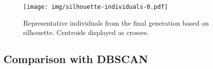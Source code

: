 \begin{figure}[htbp]
    \centering
    \texttt{[image: img/silhouette-individuals-0.pdf]}
    \caption{Representative individuals from the final generation based on
             silhouette. Centroids displayed as
             crosses.}\label{figure:silhouette-individuals}
\end{figure}


\subsection{Comparison with DBSCAN}
